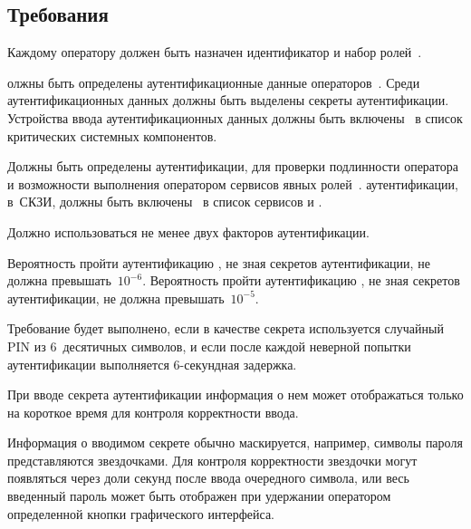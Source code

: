\subsection{Требования}\label{IA.Reqs}

\label{R.IA.Id} %
Каждому оператору должен быть назначен идентификатор и набор 
ролей~.

\label{R.IA.AuthData} %
олжны быть определены аутентификационные данные 
операторов~. 
% 
Среди аутентификационных данных должны быть выделены 
секреты аутентификации.
%
Устройства ввода аутентификационных данных должны быть
включены~ в список критических системных компонентов. 

\label{R.IA.Auth} %
Должны быть определены  аутентификации, 
 для проверки подлинности оператора и возможности 
выполнения оператором сервисов явных ролей~.
%
 аутентификации,  в~СКЗИ,
должны быть включены~ в список сервисов
и .

\label{R.IA.2FA} %
Должно использоваться не менее двух факторов аутентификации.

\label{R.IA.AuthStrength} %
Вероятность пройти аутентификацию , 
не зная секретов аутентификации, 
не должна превышать~$10^{-6}$.
%
Вероятность пройти аутентификацию , 
не зная секретов аутентификации, 
не должна превышать~$10^{-5}$.

\begin{note}
Требование будет выполнено, если в качестве секрета используется случайный PIN
из $6$~десятичных символов, и если после каждой неверной попытки аутентификации
выполняется $6$-секундная задержка.
\end{note}

\label{R.IA.PwdMask} %
При вводе секрета аутентификации информация о нем может отображаться только на 
короткое время для контроля корректности ввода.

\begin{note}
Информация о вводимом секрете обычно маскируется, например, символы пароля
представляются звездочками. Для контроля корректности звездочки могут появляться
через доли секунд после ввода очередного символа, или весь 
введенный пароль может быть отображен при удержании оператором определенной 
кнопки графического интерфейса.
\end{note}

